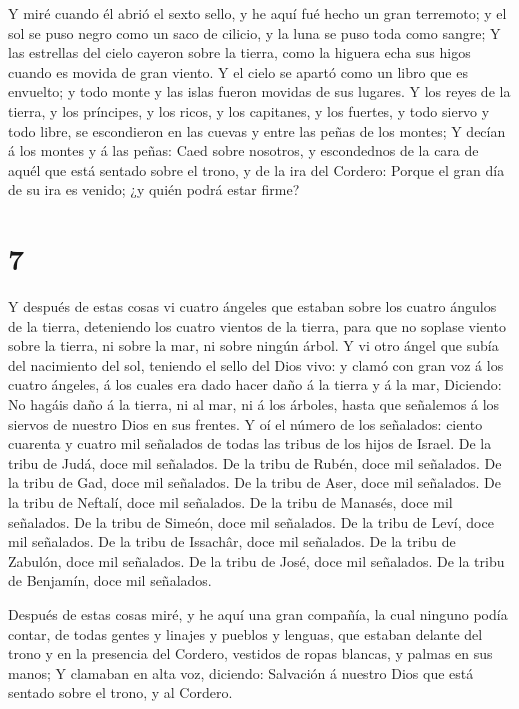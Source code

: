  Y miré cuando él abrió el sexto sello, y he aquí fué hecho
un gran terremoto; y el sol se puso negro como un saco de cilicio, y la
luna se puso toda como sangre;  Y las estrellas del cielo
cayeron sobre la tierra, como la higuera echa sus higos cuando es movida
de gran viento.  Y el cielo se apartó como un libro que es
envuelto; y todo monte y las islas fueron movidas de sus lugares.
 Y los reyes de la tierra, y los príncipes, y los ricos, y
los capitanes, y los fuertes, y todo siervo y todo libre, se escondieron
en las cuevas y entre las peñas de los montes;  Y decían á
los montes y á las peñas: Caed sobre nosotros, y escondednos de la cara
de aquél que está sentado sobre el trono, y de la ira del Cordero:
 Porque el gran día de su ira es venido; ¿y quién podrá
estar firme?

\hypertarget{section-6}{%
\section{7}\label{section-6}}

 Y después de estas cosas vi cuatro ángeles que estaban
sobre los cuatro ángulos de la tierra, deteniendo los cuatro vientos de
la tierra, para que no soplase viento sobre la tierra, ni sobre la mar,
ni sobre ningún árbol.  Y vi otro ángel que subía del
nacimiento del sol, teniendo el sello del Dios vivo: y clamó con gran
voz á los cuatro ángeles, á los cuales era dado hacer daño á la tierra y
á la mar,  Diciendo: No hagáis daño á la tierra, ni al mar,
ni á los árboles, hasta que señalemos á los siervos de nuestro Dios en
sus frentes.  Y oí el número de los señalados: ciento
cuarenta y cuatro mil señalados de todas las tribus de los hijos de
Israel.  De la tribu de Judá, doce mil señalados. De la
tribu de Rubén, doce mil señalados. De la tribu de Gad, doce mil
señalados.  De la tribu de Aser, doce mil señalados. De la
tribu de Neftalí, doce mil señalados. De la tribu de Manasés, doce mil
señalados.  De la tribu de Simeón, doce mil señalados. De la
tribu de Leví, doce mil señalados. De la tribu de Issachâr, doce mil
señalados.  De la tribu de Zabulón, doce mil señalados. De
la tribu de José, doce mil señalados. De la tribu de Benjamín, doce mil
señalados.

 Después de estas cosas miré, y he aquí una gran compañía,
la cual ninguno podía contar, de todas gentes y linajes y pueblos y
lenguas, que estaban delante del trono y en la presencia del Cordero,
vestidos de ropas blancas, y palmas en sus manos;  Y
clamaban en alta voz, diciendo: Salvación á nuestro Dios que está
sentado sobre el trono, y al Cordero.

